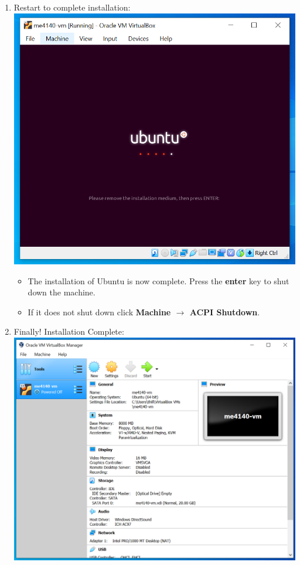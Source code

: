 \documentclass[12pt]{article}
\begin{document}
\begin{description}
\begin{description}
\begin{enumerate}
\item Restart to complete installation: \vspace{5mm} \\
      		\includegraphics[scale=.55]{Capture22.png}
      		 \begin{itemize}
        	\item The installation of Ubuntu is now complete. Press the {\bf enter} key to shut down the machine. 
        	\item If it does not shut down click {\bf Machine $\rightarrow $ ACPI Shutdown}. 
    		\end{itemize}  
  \vspace{5mm}   		
    		\item Finally! Installation Complete: \vspace{5mm} \\
      		\includegraphics[scale=.55]{CaptureY.png}

\end{enumerate}
\end{description}
\end{description}
\end{document}
